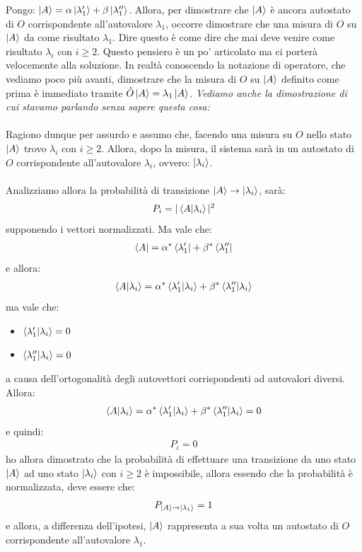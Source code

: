 \begin{myprf}	
	Pongo: $\ket{A} = \alpha \ket{\lambda_1'} + \beta \ket{\lambda_1''}$. Allora, per dimostrare che $\ket{A}$ è ancora autostato di $O$ corrispondente all'autovalore $\lambda_1$, occorre dimostrare che una misura di $O$ su $\ket{A}$ da come risultato $\lambda_1$. Dire questo è come dire che mai deve venire come risultato $\lambda_i$ con $i \geq 2$. Questo pensiero è un po' articolato ma ci porterà velocemente alla soluzione. In realtà conoscendo la notazione di operatore, che vediamo poco più avanti, dimostrare che la misura di $O$ su $\ket{A}$ definito come prima è immediato tramite $\hat{O} \ket{A} = \lambda_1 \ket{A}$. \textit{Vediamo anche la dimostrazione di cui stavamo parlando senza sapere questa cosa:}
	\\
	\\
	Ragiono dunque per assurdo e assumo che, facendo una misura su $O$ nello stato $\ket{A}$ trovo $\lambda_i$ con $i \geq 2$. Allora, dopo la misura, il sistema sarà in un autostato di $O$ corrispondente all'autovalore $\lambda_i$, ovvero: $\ket{\lambda_i}$.
	\\
	\\
	Analizziamo allora la probabilità di transizione $\ket{A} \to \ket{\lambda_i}$, sarà:
\begin{align*}
	P_i = |\braket{A}{\lambda_i}|^2
\end{align*}
	supponendo i vettori normalizzati. Ma vale che:
\begin{align*}
	\bra{A} = \alpha^* \bra{\lambda_1'} + \beta^* \bra{\lambda_1''}
\end{align*}
	e allora:
\begin{align*}
	\braket{A}{\lambda_i} = \alpha^* \braket{\lambda_1'}{\lambda_i} + \beta^* \braket{\lambda_1''}{\lambda_i}
\end{align*}
	ma vale che:
\begin{itemize}
	\item	$\braket{\lambda_1'}{\lambda_i} = 0$
	\item $\braket{\lambda_1''}{\lambda_i} = 0$
\end{itemize}
	a causa dell'ortogonalità degli autovettori corrispondenti ad autovalori diversi. Allora:
\begin{align*}
	\braket{A}{\lambda_i} = \alpha^* \braket{\lambda_1'}{\lambda_i} + \beta^* \braket{\lambda_1''}{\lambda_i} = 0
\end{align*}
	e quindi:
\begin{align*}
	P_i = 0
\end{align*}
	ho allora dimostrato che la probabilità di effettuare una transizione da uno stato $\ket{A}$ ad uno stato $\ket{\lambda_i}$ con $i \geq 2$ è impossibile, allora essendo che la probabilità è normalizzata, deve essere che:
\begin{align*}
	P_{\ket{A} \to \ket{\lambda_1}} = 1
\end{align*}
	e allora, a differenza dell'ipotesi, $\ket{A}$ rappresenta a sua volta un autostato di $O$ corrispondente all'autovalore $\lambda_1$.
\end{myprf}

